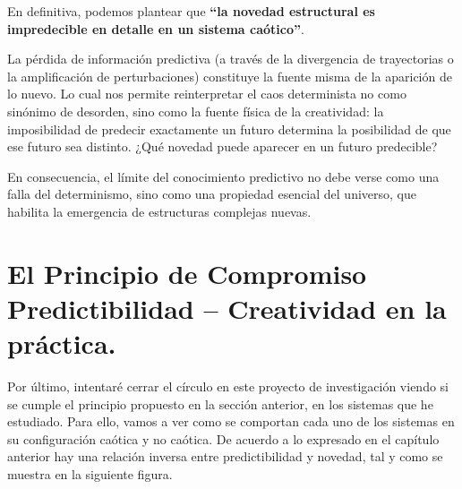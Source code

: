 \documentclass[
  10pt,
  a4paper,
  DIV=11,
  numbers=noendperiod,
  open=any]{scrreprt}
\numberwithin{equation}{chapter}
\numberwithin{equation}{section}
\renewcommand{\[}{\begin{equation}}
\renewcommand{\]}{\end{equation}}
\begin{document}
En definitiva, podemos plantear que \textbf{``la novedad estructural es
impredecible en detalle en un sistema caótico''}.

La pérdida de información predictiva (a través de la divergencia de trayectorias o la amplificación de perturbaciones) constituye la fuente misma de la aparición de lo nuevo. Lo cual nos permite reinterpretar el caos determinista no como sinónimo de desorden, sino como la fuente física de la creatividad:
la imposibilidad de predecir exactamente un futuro determina la posibilidad de que ese futuro sea distinto. ¿Qué novedad puede aparecer en un futuro predecible?

En consecuencia, el límite del conocimiento predictivo no debe verse como una falla del determinismo, sino como una propiedad esencial del universo, que habilita la emergencia de estructuras complejas nuevas.





\chapter{El Principio de Compromiso Predictibilidad -- Creatividad en la
práctica.}\label{practica}

Por último, intentaré cerrar el círculo en este proyecto de
investigación viendo si se cumple el principio propuesto en la sección
anterior, en los sistemas que he estudiado. Para ello, vamos a ver como
se comportan cada uno de los sistemas en su configuración caótica y no
caótica. De acuerdo a lo expresado en el capítulo anterior hay una relación inversa entre predictibilidad y novedad, tal y como se muestra en la siguiente figura.
\end{document}
